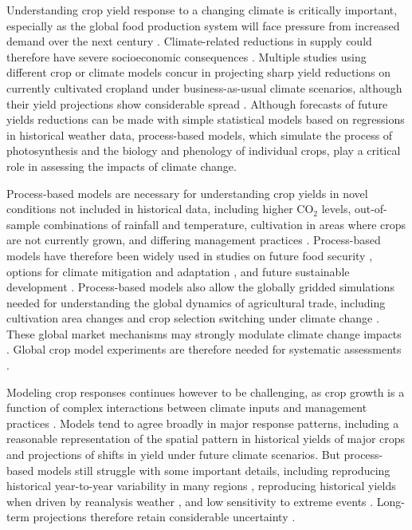 \documentclass[gmd, manuscript]{copernicus} %
\begin{document}
\introduction
\label{S:1}
Understanding crop yield response to a changing climate is critically important, especially as the global food production system will face pressure from increased demand over the next century \citep{bodirsky2015}. 
Climate-related reductions in supply could therefore have severe socioeconomic consequences \citep[e.g.][]{Stevanovic2016,Wiebe_2015}. 
Multiple studies using different crop or climate models concur in projecting sharp yield reductions on currently cultivated cropland under {business-as-usual} climate scenarios, although their yield projections show considerable spread \citep[e.g.][and references therein]{Rosenzweig2014, Schauberger2017, porter2014}. 
Although forecasts of future yields reductions can be made with simple statistical models based on regressions in historical weather data, process-based models, which simulate the process of photosynthesis and the biology and phenology of individual crops, play a critical role in assessing the impacts of climate change.

Process-based models are necessary for understanding crop yields in novel conditions not included in historical data, including higher CO$_2$ levels, out-of-sample combinations of rainfall and temperature, cultivation in areas where crops are not currently grown, and differing management practices \citep[e.g.][]{pugh_climate_2016, Roberts2017,minoli2019modelling}. Process-based models have therefore been widely used in studies on future food security \citep{wheeler2013climate}, options for climate mitigation \citep{muller2015} and adaptation \citep{challinor2018improving}, and future sustainable development \citep{humpenoder2018large}.
Process-based models also allow the globally gridded simulations needed for understanding 
the global dynamics of agricultural trade, including  cultivation area changes and crop selection switching under climate change  \citep{rosenzweig2018,ruane2018}. These global market mechanisms may strongly modulate climate change impacts \citep{Stevanovic2016,hasegawa2018risk}.
Global crop model experiments are therefore needed for systematic assessments \citep{muller_global_2017}.

Modeling crop responses continues however to be challenging, as crop growth is a function of complex interactions between climate inputs and management practices \citep{Boote13,rotter2011}. 
Models tend to agree broadly in major response patterns, including a reasonable representation of the spatial pattern in historical yields of major crops \citep[e.g.][]{Elliott2015, muller_global_2017} and projections of shifts in yield under future climate scenarios. 
But process-based models still struggle with some important details, including reproducing historical year-to-year variability in many regions \citep[e.g.][]{muller_global_2017}, reproducing historical yields when driven by reanalysis weather \citep[e.g.][]{Glotter14}, and low sensitivity to extreme events \citep[e.g.][]{Glotter15, Jag2018, schewe2019}. 
Long-term projections therefore retain considerable uncertainty \citep{WOLF2002217, JAGTAP200273, Iizumi2010, ANGULO201332, Asseng2013, Asseng2015}. 
\end{document}
